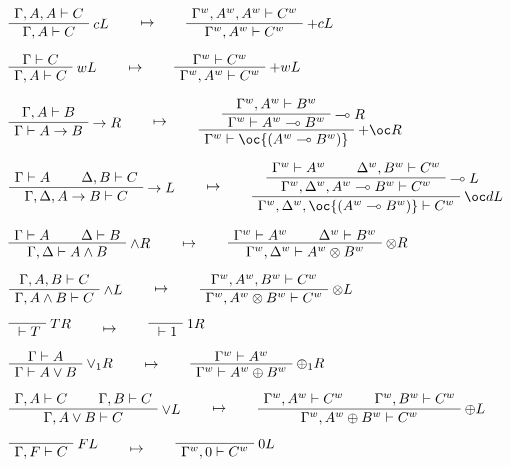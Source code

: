 \(\AxRule{\Gamma,A,A\vdash C}
\LabelRule{c L}
\UnaRule{\Gamma,A\vdash C}
\DisplayProof
\qquad\mapsto\qquad
\AxRule{\Gamma^w,A^w,A^w\vdash C^w}
\LabelRule{+ c L}
\UnaRule{\Gamma^w,A^w\vdash C^w}
\DisplayProof\)

\(\AxRule{\Gamma\vdash C}
\LabelRule{w L}
\UnaRule{\Gamma,A\vdash C}
\DisplayProof
\qquad\mapsto\qquad
\AxRule{\Gamma^w\vdash C^w}
\LabelRule{+ w L}
\UnaRule{\Gamma^w,A^w\vdash C^w}
\DisplayProof\)

\(\AxRule{\Gamma,A\vdash B}
\LabelRule{\imp R}
\UnaRule{\Gamma\vdash A\imp B}
\DisplayProof
\qquad\mapsto\qquad
\AxRule{\Gamma^w,A^w\vdash B^w}
\LabelRule{\limp R}
\UnaRule{\Gamma^w\vdash A^w\limp B^w}
\LabelRule{+ \oc R}
\UnaRule{\Gamma^w\vdash \oc{(A^w\limp B^w)}}
\DisplayProof\)

\(\AxRule{\Gamma\vdash A}
\AxRule{\Delta,B\vdash C}
\LabelRule{\imp L}
\BinRule{\Gamma,\Delta,A\imp B\vdash C}
\DisplayProof
\qquad\mapsto\qquad
\AxRule{\Gamma^w\vdash A^w}
\AxRule{\Delta^w,B^w\vdash C^w}
\LabelRule{\limp L}
\BinRule{\Gamma^w,\Delta^w,A^w\limp B^w\vdash C^w}
\LabelRule{\oc d L}
\UnaRule{\Gamma^w,\Delta^w,\oc{(A^w\limp B^w)}\vdash C^w}
\DisplayProof\)

\(\AxRule{\Gamma\vdash A}
\AxRule{\Delta\vdash B}
\LabelRule{\wedge R}
\BinRule{\Gamma,\Delta\vdash A\wedge B}
\DisplayProof
\qquad\mapsto\qquad
\AxRule{\Gamma^w\vdash A^w}
\AxRule{\Delta^w\vdash B^w}
\LabelRule{\tens R}
\BinRule{\Gamma^w,\Delta^w\vdash A^w\tens B^w}
\DisplayProof\)

\(\AxRule{\Gamma,A,B\vdash C}
\LabelRule{\wedge L}
\UnaRule{\Gamma,A\wedge B\vdash C}
\DisplayProof
\qquad\mapsto\qquad
\AxRule{\Gamma^w,A^w,B^w\vdash C^w}
\LabelRule{\tens L}
\UnaRule{\Gamma^w,A^w\tens B^w\vdash C^w}
\DisplayProof\)

\(\LabelRule{T R}
\NulRule{{}\vdash T}
\DisplayProof
\qquad\mapsto\qquad
\LabelRule{\one R}
\NulRule{{}\vdash \one}
\DisplayProof\)

\(\AxRule{\Gamma\vdash A}
\LabelRule{\vee_1 R}
\UnaRule{\Gamma\vdash A\vee B}
\DisplayProof
\qquad\mapsto\qquad
\AxRule{\Gamma^w\vdash A^w}
\LabelRule{\plus_1 R}
\UnaRule{\Gamma^w\vdash A^w\plus B^w}
\DisplayProof\)

\(\AxRule{\Gamma,A\vdash C}
\AxRule{\Gamma,B\vdash C}
\LabelRule{\vee L}
\BinRule{\Gamma,A\vee B\vdash C}
\DisplayProof
\qquad\mapsto\qquad
\AxRule{\Gamma^w,A^w\vdash C^w}
\AxRule{\Gamma^w,B^w\vdash C^w}
\LabelRule{\plus L}
\BinRule{\Gamma^w,A^w\plus B^w\vdash C^w}
\DisplayProof\)

\(\LabelRule{F L}
\NulRule{\Gamma,F\vdash C}
\DisplayProof
\qquad\mapsto\qquad
\LabelRule{\zero L}
\NulRule{\Gamma^w,\zero\vdash C^w}
\DisplayProof\)

